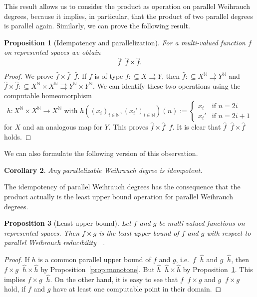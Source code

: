\documentclass[jsl,10pt]{noasl}
\def\IN{{\mathbb{N}}}
\def\In{\subseteq}
\def\mto{\rightrightarrows}
\def\leqW{\mathop{\leq_{\mathrm{W}}}}
\def\equivW{\mathop{\equiv_{\mathrm{W}}}}
\def\leqSW{\mathop{\leq_{\mathrm{sW}}}}
\def\equivSW{\mathop{\equiv_{\mathrm{sW}}}}
\def\leqPW{\mathop{\leq_{\widehat{\mathrm{W}}}}}
\newtheorem{proposition}{Proposition}[section]
\newtheorem{corollary}[proposition]{Corollary}
\begin{document}
This result allows us to consider the product as operation on parallel
Weihrauch degrees, because it implies, in particular, that the product
of two parallel degrees is parallel again. 
Similarly, we can prove the following result.

\begin{proposition}[Idempotency and parallelization]
\label{prop:absorb}
For a multi-valued function $f$ on represented spaces we obtain
\[\widehat{f}\equivSW\widehat{f}\times\widehat{f}.\]
\end{proposition}
\begin{proof}
We prove $\widehat{f}\times\widehat{f}\leqSW\widehat{f}$. If $f$ is of type
$f:\In X\mto Y$, then $\widehat{f}:\In X^\IN\mto Y^\IN$ and 
$\widehat{f}\times\widehat{f}:\In X^\IN\times X^\IN\mto Y^\IN\times Y^\IN$.
We can identify these two operations using the computable homeomorphism
\[h:X^\IN\times X^\IN\to X^\IN\mbox{ with }h((x_i)_{i\in\IN},(x_i')_{i\in\IN})(n):=\left\{\begin{array}{ll}
  x_i & \mbox{if $n=2i$}\\
  x_i' & \mbox{if $n=2i+1$}
\end{array}\right.\]
for $X$ and an analogous map for $Y$.
This proves $\widehat{f}\times\widehat{f}\leqSW\widehat{f}$. 
It is clear that $\widehat{f}\leqSW\widehat{f}\times\widehat{f}$ holds.
\end{proof}

We can also formulate the following version of this observation.

\begin{corollary}
Any parallelizable Weihrauch degree is idempotent.
\end{corollary}

The idempotency of parallel Weihrauch degrees has the consequence that the product 
actually is the least upper bound operation for parallel Weihrauch degrees.

\begin{proposition}[Least upper bound]
\label{prop:least-lower-bound}
Let $f$ and $g$ be multi-valued functions on represented spaces.
Then $f\times g$ is the least upper bound of $f$ and $g$
with respect to parallel Weihrauch reducibility $\leqPW$.
\end{proposition}
\begin{proof}
If $h$ is a common parallel upper bound of $f$ and $g$, i.e.\ $f\leqW\widehat{h}$ and $g\leqW\widehat{h}$,
then $f\times g\leqW\widehat{h}\times\widehat{h}$ by Proposition~\ref{prop:monotone}.
But $\widehat{h}\equivW\widehat{h}\times\widehat{h}$ by Proposition~\ref{prop:absorb}.
This implies $f\times g\leqW\widehat{h}$.
On the other hand, it is easy to see that $f\leqW f\times g$ and $g\leqW f\times g$ hold,
if $f$ and $g$ have at least one computable point in their domain.
\end{proof}
\end{document}
